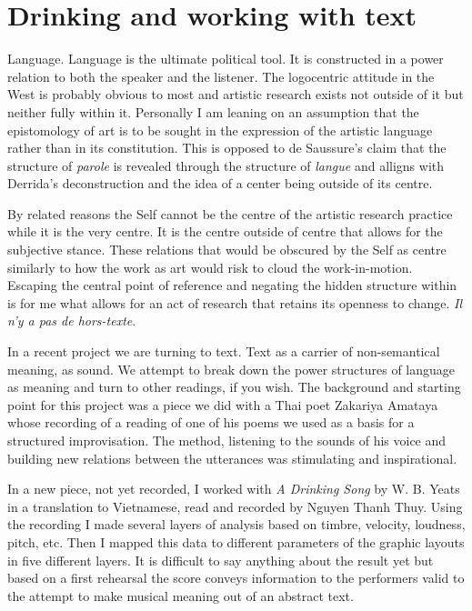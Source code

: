 \documentclass{article}
\begin{document}
\section*{Drinking and working with text}

Language. Language is the ultimate political tool. It is constructed in a power relation to both the speaker and the listener. The logocentric attitude in the West is probably obvious to most and artistic research exists not outside of it but neither fully within it. Personally I am leaning on an assumption that the epistomology of art is to be sought in the expression of the artistic language rather than in its constitution. This is opposed to de Saussure's claim that the structure of \emph{parole} is revealed through the structure of \emph{langue} and alligns with Derrida's deconstruction and the idea of a center being outside of its centre. 

By related reasons the Self cannot be the centre of the artistic research practice while it is the very centre. It is the centre outside of centre that allows for the subjective stance. These relations that would be obscured by the Self as centre similarly to how the work as art would risk to cloud the work-in-motion. Escaping the central point of reference and negating the hidden structure within is for me what allows for an act of research that retains its openness to change. \emph{Il n'y a pas de hors-texte}. 


In a recent project we are turning to text. Text as a carrier of non-semantical meaning, as sound. We attempt to break down the power structures of language as meaning and turn to other readings, if you wish. The background and starting point for this project was a piece we did with a Thai poet Zakariya Amataya whose recording of a reading of one of his poems we used as a basis for a structured improvisation. The method, listening to the sounds of his voice and building new relations between the utterances was stimulating and inspirational.

In a new piece, not yet recorded, I worked with \emph{A Drinking Song} by W. B. Yeats in a translation to Vietnamese, read and recorded by Nguyen Thanh Thuy. Using the recording I made several layers of analysis based on timbre, velocity, loudness, pitch, etc. Then I mapped this data to different parameters of the graphic layouts in five different layers. It is difficult to say anything about the result yet but based on a first rehearsal the score conveys information to the performers valid to the attempt to make musical meaning out of an abstract text.
\end{document}
